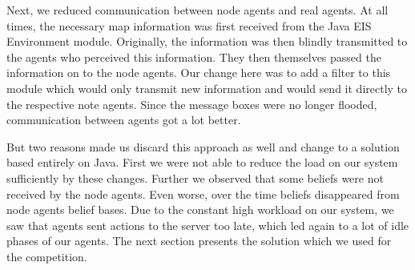 Next, we reduced communication between node agents and real agents.
At all times, the necessary map information was first received from the Java EIS Environment module.
Originally, the information was then blindly transmitted to the agents who perceived this information.
They then themselves passed the information on to the node agents.
Our change here was to add a filter to this module which would only transmit new information and would send it directly to the respective note agents.
Since the message boxes were no longer flooded, communication between agents got a lot better.

But two reasons made us discard this approach as well and change to a solution based entirely on Java.
First we were not able to reduce the load on our system sufficiently by these changes.
Further we observed that some beliefs were not received by the node agents.
Even worse, over the time beliefs disappeared from node agents belief bases.
Due to the constant high workload on our system, we saw that agents sent actions to the server too late, which led again to a lot of idle phases of our agents.
The next section presents the solution which we used for the competition.

